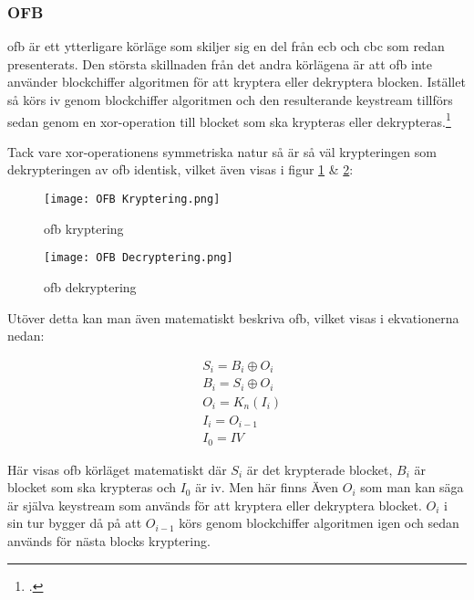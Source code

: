 \subsubsection{OFB}
\label{sec:ofb}
\acrlong{ofb} är ett ytterligare körläge som skiljer sig en del från \acrshort{ecb}
och \acrshort{cbc} som redan presenterats. Den största skillnaden från det andra
körlägena är att \acrshort{ofb} inte använder blockchiffer algoritmen för att kryptera
eller dekryptera blocken. Istället så körs \acrshort{iv} genom blockchiffer algoritmen
och den resulterande \gls{keystream} tillförs sedan genom en \gls{xor}-operation till
blocket som ska krypteras eller dekrypteras.\footcite{dworkin2001sp}

Tack vare \gls{xor}-operationens symmetriska natur så är så väl krypteringen som
dekrypteringen av \acrshort{ofb} identisk, vilket även visas i figur \ref{fig:ofb-mode-enc}
\& \ref{fig:ofb-mode-dec}:

\begin{figure}[H]
    \texttt{[image: OFB Kryptering.png]}
    \caption{\acrlong{ofb} kryptering}
    \label{fig:ofb-mode-enc}
\end{figure}

\begin{figure}[H]
    \texttt{[image: OFB Decryptering.png]}
    \caption{\acrlong{ofb} dekryptering}
    \label{fig:ofb-mode-dec}
\end{figure}

Utöver detta kan man även matematiskt beskriva \acrshort{ofb}, vilket visas i ekvationerna nedan:

\begin{equation}
    \label{eq:ofb-encryption}
    \begin{aligned}
        &S_i = B_i \oplus O_i\\\nonumber
        &B_i = S_i \oplus O_i\\
        &O_i = K_n(I_i)\\
        &I_i = O_{i-1}\\
        &I_0 = IV
    \end{aligned}
\end{equation}

Här visas \acrshort{ofb} körläget matematiskt där $S_i$ är det krypterade blocket,
$B_i$ är blocket som ska krypteras och $I_0$ är \acrshort{iv}. Men här finns Även
$O_i$ som man kan säga är själva \gls{keystream} som används för att kryptera eller
dekryptera blocket. $O_i$ i sin tur bygger då på att $O_{i-1}$ körs genom blockchiffer
algoritmen igen och sedan används för nästa blocks kryptering.


